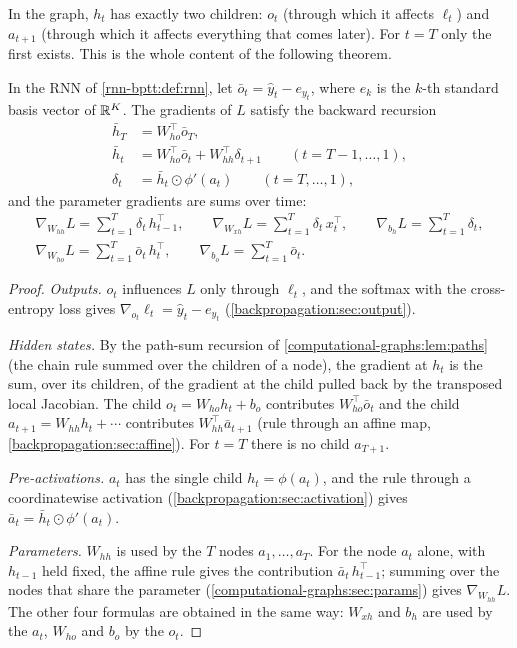 \begin{notechapter}
In the graph, $h_t$ has exactly two children: $o_t$ (through which it affects $\ell_t$) and
$a_{t+1}$ (through which it affects everything that comes later). For $t = T$ only the first
exists. This is the whole content of the following theorem.

\begin{theorem}[BPTT]\label{rnn-bptt:thm:bptt}
In the RNN of \cref{rnn-bptt:def:rnn}, let $\bar o_t = \hat y_t - e_{y_t}$, where $e_k$ is the $k$-th standard basis
vector of $\mathbb{R}^K$. The gradients of $L$ satisfy the backward recursion
\begin{align*}
  \bar h_T &= W_{ho}^\top\bar o_T,\\
  \bar h_t &= W_{ho}^\top\bar o_t + W_{hh}^\top\delta_{t+1}\qquad(t = T-1,\dots,1),\\
  \delta_t &= \bar h_t\odot\phi'(a_t)\qquad(t = T,\dots,1),
\end{align*}
and the parameter gradients are sums over time:
\begin{gather*}
  \nabla_{W_{hh}}L = \sum_{t=1}^T\delta_t\,h_{t-1}^\top,\qquad
  \nabla_{W_{xh}}L = \sum_{t=1}^T\delta_t\,x_t^\top,\qquad
  \nabla_{b_h}L = \sum_{t=1}^T\delta_t,\\
  \nabla_{W_{ho}}L = \sum_{t=1}^T\bar o_t\,h_t^\top,\qquad
  \nabla_{b_o}L = \sum_{t=1}^T\bar o_t .
\end{gather*}
\end{theorem}

\begin{proof}
\emph{Outputs.} $o_t$ influences $L$ only through $\ell_t$, and the softmax with the cross-entropy
loss gives $\nabla_{o_t}\ell_t = \hat y_t - e_{y_t}$ (\cref{backpropagation:sec:output}).

\emph{Hidden states.} By the path-sum recursion of \cref{computational-graphs:lem:paths}
(the chain rule summed over the children of a node), the gradient at $h_t$ is the sum, over
its children, of the gradient at the child pulled back by the transposed local Jacobian.
The child $o_t = W_{ho}h_t + b_o$ contributes $W_{ho}^\top\bar o_t$ and the child $a_{t+1} = W_{hh}h_t + \cdots$ contributes
$W_{hh}^\top\bar a_{t+1}$ (rule through an affine map, \cref{backpropagation:sec:affine}). For $t = T$ there is no
child $a_{T+1}$.

\emph{Pre-activations.} $a_t$ has the single child $h_t = \phi(a_t)$, and the rule through a
coordinatewise activation (\cref{backpropagation:sec:activation}) gives
$\bar a_t = \bar h_t\odot\phi'(a_t)$.

\emph{Parameters.} $W_{hh}$ is used by the $T$ nodes $a_1,\dots,a_T$. For the node $a_t$ alone, with $h_{t-1}$
held fixed, the affine rule gives the contribution $\bar a_t\,h_{t-1}^\top$; summing over the nodes that
share the parameter (\cref{computational-graphs:sec:params}) gives $\nabla_{W_{hh}}L$. The other four
formulas are obtained in the same way: $W_{xh}$ and $b_h$ are used by the $a_t$, $W_{ho}$ and $b_o$ by
the $o_t$.
\end{proof}


\end{notechapter}
